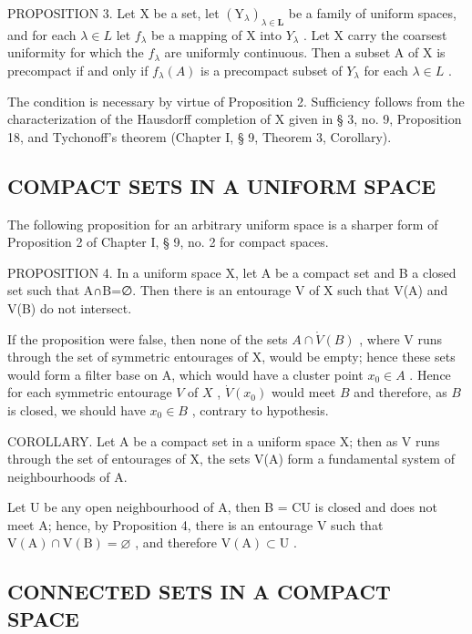 PROPOSITION 3. Let X be a set, let \((\mathrm{Y}_{\lambda})_{\lambda \in \mathbf{L}}\) be a family of uniform spaces, and for each \(\lambda \in L\) let \(f_{\lambda}\) be a mapping of X into \(Y_{\lambda}\) . Let X carry the coarsest uniformity for which the \(f_{\lambda}\) are uniformly continuous. Then a subset A of X is precompact if and only if \(f_{\lambda}(A)\) is a precompact subset of \(Y_{\lambda}\) for each \(\lambda \in L\) .

The condition is necessary by virtue of Proposition 2. Sufficiency follows from the characterization of the Hausdorff completion of X given in § 3, no. 9, Proposition 18, and Tychonoff's theorem (Chapter I, § 9, Theorem 3, Corollary).

\subsection{COMPACT SETS IN A UNIFORM SPACE}

The following proposition for an arbitrary uniform space is a sharper form of Proposition 2 of Chapter I, § 9, no. 2 for compact spaces.

PROPOSITION 4. In a uniform space X, let A be a compact set and B a closed set such that A∩B=∅. Then there is an entourage V of X such that V(A) and V(B) do not intersect.

If the proposition were false, then none of the sets \(A \cap \mathring{V}(B)\) , where V runs through the set of symmetric entourages of X, would be empty; hence these sets would form a filter base on A, which would have a cluster point \(x_0 \in A\) . Hence for each symmetric entourage \(V\) of \(X\) , \(\dot{V}(x_0)\) would meet \(B\) and therefore, as \(B\) is closed, we should have \(x_0 \in B\) , contrary to hypothesis.

COROLLARY. Let A be a compact set in a uniform space X; then as V runs through the set of entourages of X, the sets V(A) form a fundamental system of neighbourhoods of A.

Let U be any open neighbourhood of A, then B = CU is closed and does not meet A; hence, by Proposition 4, there is an entourage V such that \(\mathrm{V}(\mathrm{A}) \cap \mathrm{V}(\mathrm{B}) = \varnothing\) , and therefore \(\mathrm{V}(\mathrm{A}) \subset \mathrm{U}\) .

\subsection{CONNECTED SETS IN A COMPACT SPACE}

